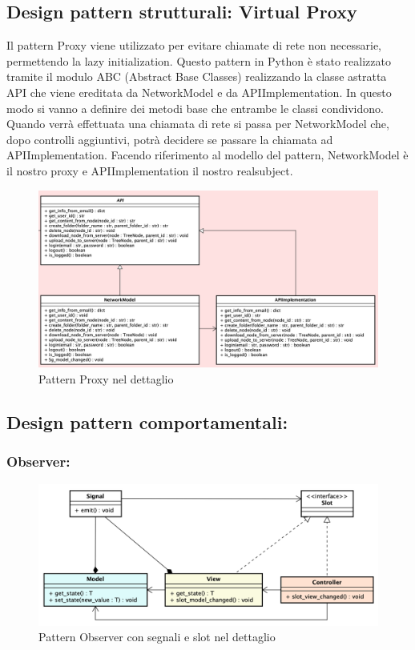 \subsection{Design pattern strutturali: Virtual Proxy}
Il pattern Proxy viene utilizzato per evitare chiamate di rete non necessarie, permettendo la lazy initialization.\newline{}
Questo pattern in Python è stato realizzato tramite il modulo ABC (Abstract Base Classes) realizzando la classe astratta API che viene ereditata da NetworkModel e da APIImplementation. In questo modo si vanno a definire dei metodi base che entrambe le classi condividono. Quando verrà effettuata una chiamata di rete si passa per NetworkModel che, dopo controlli aggiuntivi, potrà decidere se passare la chiamata ad APIImplementation. Facendo riferimento al modello del pattern, NetworkModel è il nostro proxy e APIImplementation il nostro realsubject.
\begin{figure}[H]
    \centering
    \includegraphics[scale = 0.45]{components/img/proxy-model.png}
    \caption{Pattern Proxy nel dettaglio}
    \label{fig:Pattern proxy nel dettaglio}
\end{figure}
\subsection{Design pattern comportamentali:}
\subsubsection{Observer:}
\begin{figure}[H]
    \centering
    \includegraphics[scale = 0.45]{components/img/observer-implementazione.png}
    \caption{Pattern Observer con segnali e slot nel dettaglio}
    \label{fig:Pattern observer con segnali e slot}
\end{figure}

